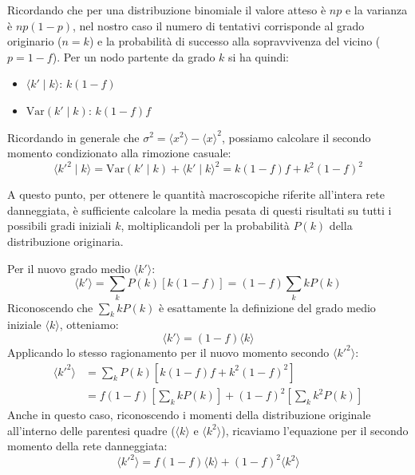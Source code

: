 \documentclass[12pt,italian]{article}
\begin{document}
Ricordando che per una distribuzione binomiale il valore atteso è $np$ e la varianza è $np(1-p)$, nel nostro caso il numero di tentativi corrisponde al grado originario ($n = k$) e la probabilità di successo alla sopravvivenza del vicino ($p = 1-f$). Per un nodo partente da grado $k$ si ha quindi:
\begin{itemize}
    \item $\langle k' \mid k \rangle$: $k(1-f)$
    \item $\text{Var}(k' \mid k)$: $k(1-f)f$
\end{itemize}
Ricordando in generale che $ \sigma^{2} = \langle x^2 \rangle - \langle x \rangle^2 $, possiamo calcolare il secondo momento condizionato alla rimozione casuale:
\begin{equation}
    \langle k'^2 \mid k \rangle = \text{Var}(k' \mid k) + \langle k' \mid k \rangle^2 = k(1-f)f + k^2(1-f)^2
\end{equation}

A questo punto, per ottenere le quantità macroscopiche riferite all'intera rete danneggiata, è sufficiente calcolare la media pesata di questi risultati su tutti i possibili gradi iniziali $k$, moltiplicandoli per la probabilità $P(k)$ della distribuzione originaria.

Per il nuovo grado medio $\langle k' \rangle$:
\begin{equation}
    \langle k' \rangle = \sum_{k} P(k) [k(1-f)] = (1-f) \sum_{k} k P(k)
\end{equation}
Riconoscendo che $\sum_{k} k P(k)$ è esattamente la definizione del grado medio iniziale $\langle k \rangle$, otteniamo:
\begin{equation}
    \langle k' \rangle = (1-f) \langle k \rangle
    \label{eq:k_prime}
\end{equation}
Applicando lo stesso ragionamento per il nuovo momento secondo $\langle k'^2 \rangle$:
\begin{align}
    \langle k'^2 \rangle &= \sum_{k} P(k) \left[ k(1-f)f + k^2(1-f)^2 \right] \nonumber \\
    &= f(1-f) \left[ \sum_{k} k P(k) \right] + (1-f)^2 \left[ \sum_{k} k^2 P(k) \right]
\end{align}
Anche in questo caso, riconoscendo i momenti della distribuzione originale all'interno delle parentesi quadre ($\langle k \rangle$ e $\langle k^2 \rangle$), ricaviamo l'equazione per il secondo momento della rete danneggiata:
\begin{equation}
    \langle k'^2 \rangle = f(1-f)\langle k \rangle + (1-f)^2\langle k^2 \rangle
    \label{eq:k2_prime}
\end{equation}
\end{document}

